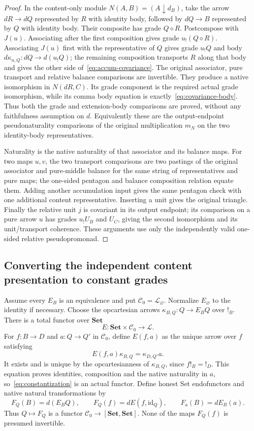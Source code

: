 \documentclass[11pt,a4paper]{article}
\theoremstyle{definition}
\newcommand{\Set}{\mathbf{Set}}
\newcommand{\Lcat}{\mathcal L}
\newcommand{\id}{\mathrm{id}}
\newcommand{\diamondc}{\mathbin{\diamond}}
\begin{document}
\begin{proof}
In the content-only module $N(A,B)=(A\downarrow d_B)$, take the arrow
$dR\to dQ$ represented by $R$ with identity body, followed by
$dQ\to B$ represented by $Q$ with identity body. Their composite has grade
$Q\diamondc R$. Postcompose with $J(u)$. Associating after the first
composition gives grade $u_!(Q\diamondc R)$. Associating $J(u)$ first
with the representative of $Q$ gives grade $u_!Q$ and body
$d\kappa_{u,Q}:dQ\to d(u_!Q)$; the remaining composition transports $R$
along that body and gives the other side of~\eqref{eq:accum-covariance}.
The original associator, pure transport and relative balance comparisons
are invertible. They produce a native isomorphism in $N(dR,C)$.
Its grade component is the required actual grade isomorphism, while its
comma body equation is exactly~\eqref{eq:covariance-body}. Thus both the
grade and extension-body comparisons are proved, without any faithfulness
assumption on $d$. Equivalently these are the output-endpoint
pseudonaturality comparisons of the original multiplication $m_N$ on
the two identity-body representatives.

Naturality is the native naturality of that associator and its balance
maps. For two maps $u,v$, the two transport comparisons are two pastings
of the original associator and pure-middle balance for the same string
of representatives and pure maps; the one-sided pentagon and balance
composition relation equate them. Adding another accumulation input gives
the same pentagon check with one additional content representative.
Inserting a unit gives the original triangle. Finally the relative unit
$j$ is covariant in its output endpoint; its comparison on a pure arrow
$u$ has grades $u_!U_B$ and $U_C$, giving the second isomorphism and its
unit/transport coherence. These arguments use only the independently valid
one-sided relative pseudopromonad.
\end{proof}

\subsection{Converting the independent content presentation to constant grades}
Assume every $E_B$ is an equivalence and put $\mathcal C_0=\Lcat_\varnothing$.
Normalize $E_\varnothing$ to the identity if necessary. Choose the
opcartesian arrows
$\kappa_{B,Q}:Q\to E_BQ$ over $!_B$.
There is a total functor over $\Set$
\begin{equation}\label{eq:constantization}
 E:\Set\times\mathcal C_0\longrightarrow\Lcat.
\end{equation}
For $f:B\to D$ and $a:Q\to Q'$ in $\mathcal C_0$, define $E(f,a)$ as the
unique arrow over $f$ satisfying
\[
 E(f,a)\kappa_{B,Q}=\kappa_{D,Q'}a.
\]
It exists and is unique by the opcartesianness of $\kappa_{B,Q}$, since
$f!_B=!_D$. This equation proves identities, composition and the native
naturality in $a$, so~\eqref{eq:constantization} is an actual functor.
Define honest Set endofunctors and native natural transformations by
\[
 F_Q(B)=d(E_BQ),\qquad F_Q(f)=dE(f,\id_Q),\qquad
 F_a(B)=dE_B(a).
\]
Thus $Q\mapsto F_Q$ is a functor
$\mathcal C_0\to[\Set,\Set]$. None of the maps $F_Q(f)$ is presumed
invertible.
\end{document}
